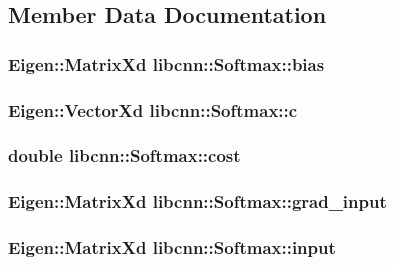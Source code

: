 \subsection{\-Member \-Data \-Documentation}
\hypertarget{classlibcnn_1_1_softmax_af7177b8068a5bb00b493684bd17e133e}{
\subsubsection[{bias}]{\setlength{\rightskip}{0pt plus 5cm}\-Eigen\-::\-Matrix\-Xd {\bf libcnn\-::\-Softmax\-::bias}}}\label{classlibcnn_1_1_softmax_af7177b8068a5bb00b493684bd17e133e}
\hypertarget{classlibcnn_1_1_softmax_a89d340fbed0365db9c30dffafc492aca}{
\subsubsection[{c}]{\setlength{\rightskip}{0pt plus 5cm}\-Eigen\-::\-Vector\-Xd {\bf libcnn\-::\-Softmax\-::c}}}\label{classlibcnn_1_1_softmax_a89d340fbed0365db9c30dffafc492aca}
\hypertarget{classlibcnn_1_1_softmax_a13cbff525a19cea4f94836f5b439b2a7}{
\subsubsection[{cost}]{\setlength{\rightskip}{0pt plus 5cm}double {\bf libcnn\-::\-Softmax\-::cost}}}\label{classlibcnn_1_1_softmax_a13cbff525a19cea4f94836f5b439b2a7}
\hypertarget{classlibcnn_1_1_softmax_a3c4257681cef58ab58ca3601400ab098}{
\subsubsection[{grad\-\_\-input}]{\setlength{\rightskip}{0pt plus 5cm}\-Eigen\-::\-Matrix\-Xd {\bf libcnn\-::\-Softmax\-::grad\-\_\-input}}}\label{classlibcnn_1_1_softmax_a3c4257681cef58ab58ca3601400ab098}
\hypertarget{classlibcnn_1_1_softmax_a6a7f3d59e90ecf66b9ddf437b452c780}{
\subsubsection[{input}]{\setlength{\rightskip}{0pt plus 5cm}\-Eigen\-::\-Matrix\-Xd {\bf libcnn\-::\-Softmax\-::input}}}\label{classlibcnn_1_1_softmax_a6a7f3d59e90ecf66b9ddf437b452c780}
